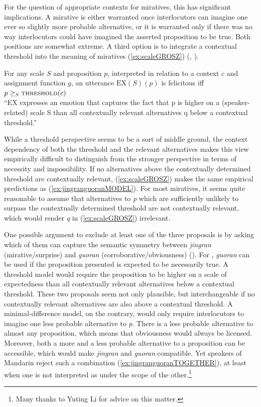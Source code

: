 For the question of appropriate contexts for miratives, this has significant implications. A mirative is either warranted once interlocutors can imagine one ever so slightly more probable alternative, or it is warranted only if there was no way interlocutors could have imagined the asserted proposition to be true. Both positions are somewhat extreme. A third option is to integrate a contextual threshold into the meaning of miratives (\ref{ex:scaleGROSZ}) (\cite{Villalta.2007}, \cite[71--73,139--148]{Grosz.2012}). 

\begin{exe}
\ex\label{ex:scaleGROSZ}
For any scale $S$ and proposition $p$, interpreted in relation to a context $c$
and assignment function $g$, an utterance $\text{EX}(S)(p)$ is felicitous iff
$p\geq_S \text{\textsc{threshold}}(c)$\\``EX expresses an emotion that captures the fact that p is higher on a (spea\-ker-related) scale S than all contextually relevant alternatives q below a contextual threshold.'' \citep[72]{Grosz.2012}
\end{exe}

While a threshold perspective seems to be a sort of middle ground, the context dependency of both the threshold and the relevant alternatives makes this view empirically difficult to distinguish from the stronger perspective in terms of necessity and impossibility. If no alternatives above the contextually determined threshold are contextually relevant, (\ref{ex:scaleGROSZ}) makes the same empirical predictions as (\ref{ex:jingranguoranMODEL}). For most miratives, it seems quite reasonable to assume that alternatives to \textit{p} which are sufficiently unlikely to surpass the contextually determined threshold are not contextually relevant, which would render \textit{q} in (\ref{ex:scaleGROSZ}) irrelevant.

One possible argument to exclude at least one of the three proposals is by asking which of them can capture the semantic symmetry between \textit{jingran} (mirative/surprise) and \textit{guoran} (corroborative/obviousness) (\cite{Wu.2008,Reich.2018}). For \citet{Wu.2008}, \textit{guoran} can be used if the proposition presented is expected to be necessarily true. A threshold model would require the proposition to be higher on a scale of expectedness than all contextually relevant alternatives below a contextual threshold. These two proposals seem not only plausible, but interchangeable if no contextually relevant alternatives are also above a contextual threshold. A minimal-difference model, on the contrary, would only require interlocutors to imagine one less probable alternative to \textit{p}. There is a less probable alternative to almost any proposition, which means that obviousness would always be licensed. Moreover, both a more and a less probable alternative to a proposition can be accessible, which would make \textit{jingran} and \textit{guoran} compatible. Yet speakers of Mandarin reject such a combination (\ref{ex:jingranguoranTOGETHER}), at least when one is not interpreted as under the scope of the other.\footnote{Many thanks to Yuting Li for advice on this matter.}

